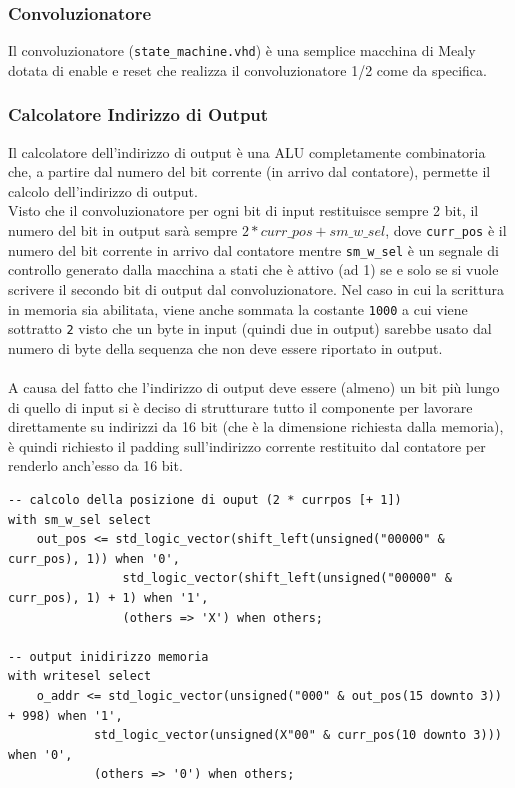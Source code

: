 \documentclass[12pt, a4paper]{article}
\begin{document}
\subsubsection{Convoluzionatore}

Il convoluzionatore (\texttt{state\_machine.vhd}) è una semplice macchina di Mealy dotata di enable e reset che
realizza il convoluzionatore 1/2 come da specifica.

\subsubsection{Calcolatore Indirizzo di Output}

Il calcolatore dell'indirizzo di output è una ALU completamente combinatoria che, a partire
dal numero del bit corrente (in arrivo dal contatore), permette il calcolo dell'indirizzo di output.
\\
\noindent Visto che il convoluzionatore per ogni bit di input restituisce sempre 2 bit, il numero del bit in output
sarà sempre $2 * curr\_pos + sm\_w\_sel$, dove \texttt{curr\_pos} è il numero del bit corrente in arrivo dal
contatore mentre \texttt{sm\_w\_sel} è un segnale di controllo generato dalla macchina a stati che è attivo
(ad 1) se e solo se si vuole scrivere il secondo bit di output dal convoluzionatore.
Nel caso in cui la scrittura in memoria sia abilitata, viene anche sommata la costante \texttt{1000} 
a cui viene sottratto \texttt{2} visto che un byte in input (quindi due in output) sarebbe usato dal numero di byte della sequenza 
che non deve essere riportato in output.
\\
\\
A causa del fatto che l'indirizzo di output deve essere (almeno) un bit più lungo di quello
di input si è deciso di strutturare tutto il componente per lavorare direttamente su indirizzi da 16 bit 
(che è la dimensione richiesta dalla memoria), è quindi richiesto il padding sull'indirizzo corrente
restituito dal contatore per renderlo anch'esso da 16 bit.

\begin{verbatim}
-- calcolo della posizione di ouput (2 * currpos [+ 1])                    
with sm_w_sel select
    out_pos <= std_logic_vector(shift_left(unsigned("00000" & curr_pos), 1)) when '0',
                std_logic_vector(shift_left(unsigned("00000" & curr_pos), 1) + 1) when '1',
                (others => 'X') when others;

-- output inidirizzo memoria
with writesel select
    o_addr <= std_logic_vector(unsigned("000" & out_pos(15 downto 3)) + 998) when '1',
            std_logic_vector(unsigned(X"00" & curr_pos(10 downto 3))) when '0',
            (others => '0') when others;  
\end{verbatim}
\end{document}
